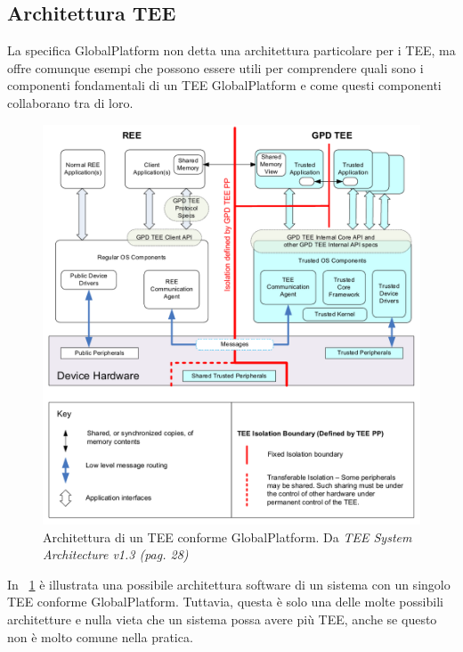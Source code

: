 \documentclass[12pt,italian]{report}
\begin{document}
\subsection{Architettura TEE}
\label{subsec:architettura-tee}

La specifica GlobalPlatform non detta una architettura particolare per i
TEE, ma offre comunque esempi che possono essere utili per comprendere
quali sono i componenti fondamentali di un TEE GlobalPlatform e come
questi componenti collaborano tra di loro.

\begin{figure}
    \centering
    \includegraphics[width=1\textwidth]{immagini/tee-system-architecture}
    \caption{
        Architettura di un TEE conforme GlobalPlatform. 
        Da \textit{TEE System Architecture v1.3 (pag. 28)}
        \cite{gp2020systemarchitecture}
    }
    \label{fig:tee-system-architecture}
\end{figure}

In \figurename~\ref{fig:tee-system-architecture} è illustrata una possibile
architettura software di un sistema con un singolo TEE conforme
GlobalPlatform. Tuttavia, questa è solo una delle molte possibili
architetture e nulla vieta che un sistema possa avere più TEE, anche se
questo non è molto comune nella pratica.
\end{document}
